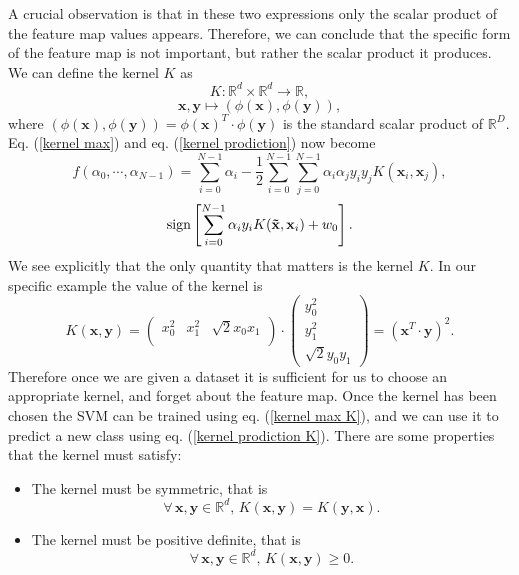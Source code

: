 \documentclass[a4paper]{article}
\begin{document}
A crucial observation is that in these two expressions only the scalar product of the feature map values appears. Therefore, we can conclude that the specific form of the feature map is not important, but rather the scalar product it produces. We can define the kernel $K$ as 
$$K:\mathbb{R}^d\times \mathbb{R}^d\rightarrow \mathbb{R},$$
\begin{equation}
    \mathbf{x}, \mathbf{y}\mapsto(\phi(\mathbf{x}), \phi(\mathbf{y})),
\end{equation}
 where $(\phi(\mathbf{x}), \phi(\mathbf{y}))=\phi(\mathbf{x})^T\cdot \phi(\mathbf{y})$ is the standard scalar product of $\mathbb{R}^D$. Eq. (\ref{kernel max}) and eq. (\ref{kernel prodiction}) now become 
 \begin{equation}
    f(\alpha_0,\cdots,\alpha_{N-1})=\sum_{i=0}^{N-1} \alpha_i-\frac{1}{2}\sum_{i=0}^{N-1}\sum_{j=0}^{N-1}\alpha_i\alpha_jy_iy_jK(\mathbf{x}_i,\mathbf{x}_j),
    \label{kernel max K}
\end{equation}
\begin{equation}
    \textup{sign}\left[\sum_{i=0}^{N-1}\alpha_iy_iK(\mathbf{\tilde{x}}, \mathbf{x}_i)+w_0\right].
    \label{kernel prodiction K}
\end{equation}
We see explicitly that the only quantity that matters is the kernel $K$. In our specific example the value of the kernel is 
\begin{equation}
    K(\mathbf{x}, \mathbf{y})= \begin{pmatrix}
        x_0^2 & x_1^2 & \sqrt{2}x_0x_1 \\
        \end{pmatrix}\cdot       \begin{pmatrix}
            y_0^2 \\
            y_1^2\\
            \sqrt{2}y_0y_1
            \end{pmatrix}=(\mathbf{x}^T\cdot\mathbf{y})^2.   
            \label{polykernel ex}   
\end{equation}
Therefore once we are given a dataset it is sufficient for us to choose an appropriate kernel, and forget about the feature map. Once the kernel has been chosen the SVM can be trained using eq. (\ref{kernel max K}), and we can use it to predict a new class using eq. (\ref{kernel prodiction K}). There are some properties that the kernel must satisfy:
\begin{itemize}
    \item The kernel must be symmetric, that is $$\forall\, \mathbf{x},\mathbf{y}\in \mathbb{R}^d,\,K(\mathbf{x},\mathbf{y})=K(\mathbf{y},\mathbf{x}).$$
    \item The kernel must be positive definite, that is $$\forall\, \mathbf{x},\mathbf{y}\in \mathbb{R}^d,\,K(\mathbf{x},\mathbf{y})\geq 0.$$
\end{itemize}
\end{document}

